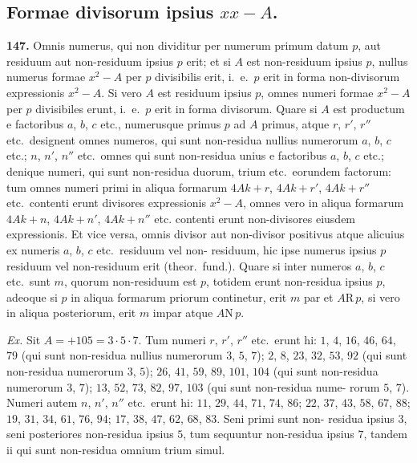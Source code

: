 \documentclass[12pt,a4paper]{article}
\newcommand{\R}{\mbox{R}}
\newcommand{\N}{\mbox{N}}
\begin{document}
\subsection*{Formae divisorum ipsius $xx - A$.}

\textbf{147.}
Omnis numerus, qui non dividitur per numerum primum datum $p$,
aut residuum aut non-residuum ipsius $p$ erit; et si $A$ est non-residuum ipsius
$p$, nullus numerus formae $x^2 - A$ per $p$ divisibilis erit, i.~e.\ $p$ erit in forma
non-divisorum expressionis $x^2 - A$. Si vero $A$ est residuum ipsius $p$, omnes
numeri formae $x^2 - A$ per $p$ divisibiles erunt, i.~e.\ $p$ erit in forma divisorum.
Quare si $A$ est productum e factoribus $a$, $b$, $c$ etc., numerusque primus $p$
ad $A$ primus, atque $r$, $r'$, $r''$ etc.\ designent omnes numeros, qui sunt non-residua
nullius numerorum $a$, $b$, $c$ etc.; $n$, $n'$, $n''$ etc.\ omnes qui sunt non-residua
unius e factoribus $a$, $b$, $c$ etc.; denique numeri, qui sunt non-residua duorum,
trium etc.\ eorundem factorum: tum omnes numeri primi in aliqua formarum
$4Ak + r$, $4Ak + r'$, $4Ak + r''$ etc.\ contenti erunt divisores expressionis
$x^2 - A$, omnes vero in aliqua formarum $4Ak + n$, $4Ak + n'$, $4Ak + n''$ etc. contenti erunt non-divisores eiusdem expressionis. Et vice versa, omnis divisor
aut non-divisor positivus atque alicuius ex numeris $a$, $b$, $c$ etc.\ residuum vel non-
residuum, hic ipse numerus ipsius $p$ residuum vel non-residuum erit (theor.\ fund.).
Quare si inter numeros $a$, $b$, $c$ etc.\ sunt $m$, quorum non-residuum est $p$, totidem
erunt non-residua ipsius $p$, adeoque si $p$ in aliqua formarum priorum continetur,
erit $m$ par et $A \R\, p$, si vero in aliqua posteriorum, erit $m$ impar atque $A \N\, p$.

\textit{Ex.} Sit $A = +105 = 3 \cdot 5 \cdot 7$. Tum numeri $r$, $r'$, $r''$ etc.\ erunt
hi: $1$, $4$, $16$, $46$, $64$, $79$ (qui sunt non-residua nullius numerorum $3$, $5$, $7$); $2$, $8$, $23$,
$32$, $53$, $92$ (qui sunt non-residua numerorum $3$, $5$); $26$, $41$, $59$, $89$, $101$, $104$ (qui sunt
non-residua numerorum $3$, $7$); $13$, $52$, $73$, $82$, $97$, $103$ (qui sunt non-residua nume-
rorum $5$, $7$). Numeri autem $n$, $n'$, $n''$ etc.\ erunt hi: $11$, $29$, $44$, $71$, $74$, $86$; $22$,
$37$, $43$, $58$, $67$, $88$; $19$, $31$, $34$, $61$, $76$, $94$; $17$, $38$, $47$, $62$, $68$, $83$. Seni primi sunt non-
residua ipsius $3$, seni posteriores non-residua ipsius $5$, tum sequuntur non-residua
ipsius $7$, tandem ii qui sunt non-residua omnium trium simul.
\end{document}
